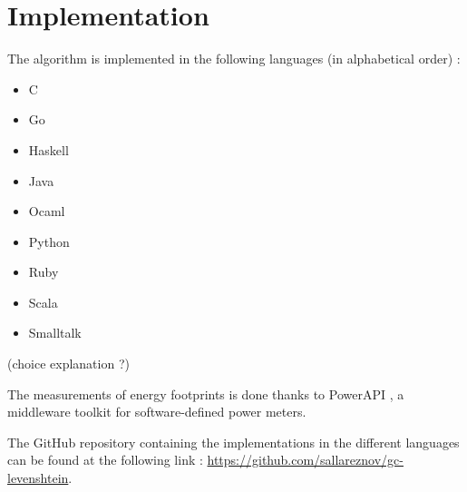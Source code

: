 \section{Implementation}
\label{sec:Implementation}
The algorithm is implemented in the following languages (in alphabetical order) :
\begin{multicols}{3}
	\begin{itemize}
		\item C
		\item Go
		\item Haskell
		\item Java
		\item Ocaml
		\item Python
		\item Ruby
		\item Scala
		\item Smalltalk
	\end{itemize}
\end{multicols}

(choice explanation ?)

The measurements of energy footprints is done thanks to PowerAPI \cite{powerapi-website}\cite{powerapi-github}, a middleware toolkit for software-defined power meters.

The GitHub repository containing the implementations in the different languages can be found at the following link : \url{https://github.com/sallareznov/gc-levenshtein}.
